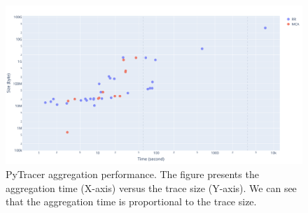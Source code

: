\documentclass[11pt]{article}
\newcommand{\pytracer}[0]{PyTracer\xspace}
\begin{document}
\begin{figure}
    \centering
    \includegraphics[width=\linewidth]{performance_parsing.pdf}
    \caption{\pytracer aggregation performance. The figure presents
    the aggregation time (X-axis) versus the trace size (Y-axis).
    We can see that the aggregation time is proportional to the trace size.}
    \label{fig:performance_parsing}
\end{figure}
\end{document}

